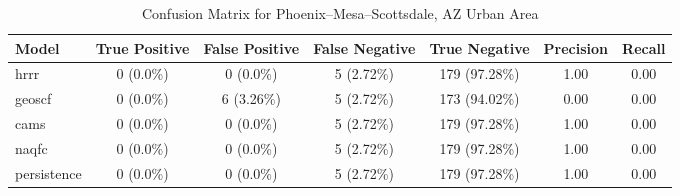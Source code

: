 \begin{table}[h!]
\centering
\begin{tabular}{lcccccc}
\hline
Model & True Positive & False Positive & False Negative & True Negative & Precision & Recall\\ \hline
hrrr & 0 (0.0\%) & 0 (0.0\%) & 5 (2.72\%) & 179 (97.28\%) & \cellcolor{green!25}1.00 & \cellcolor{green!25}0.00 \\ 
geoscf & 0 (0.0\%) & 6 (3.26\%) & 5 (2.72\%) & 173 (94.02\%) & \cellcolor{red!25}0.00 & \cellcolor{green!25}0.00 \\ 
cams & 0 (0.0\%) & 0 (0.0\%) & 5 (2.72\%) & 179 (97.28\%) & \cellcolor{green!25}1.00 & \cellcolor{green!25}0.00 \\ 
naqfc & 0 (0.0\%) & 0 (0.0\%) & 5 (2.72\%) & 179 (97.28\%) & \cellcolor{green!25}1.00 & \cellcolor{green!25}0.00 \\ 
persistence & 0 (0.0\%) & 0 (0.0\%) & 5 (2.72\%) & 179 (97.28\%) & 1.00 & 0.00 \\ 
\hline
\end{tabular}
\caption{Confusion Matrix for Phoenix--Mesa--Scottsdale, AZ Urban Area}
\end{table}

